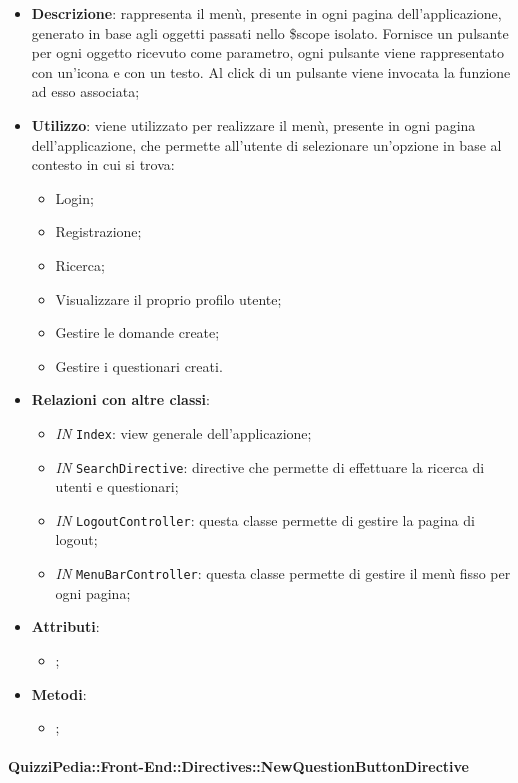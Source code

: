 \begin{itemize}
	\item \textbf{Descrizione}: rappresenta il menù, presente in ogni pagina dell'applicazione, generato in base agli oggetti passati nello \$scope isolato. Fornisce un pulsante per ogni oggetto ricevuto come parametro, ogni pulsante viene rappresentato con un’icona e con un testo. Al click di un pulsante viene invocata la funzione ad esso associata;
	\item \textbf{Utilizzo}: viene utilizzato per realizzare il menù, presente in ogni pagina dell'applicazione, che permette all'utente di selezionare un'opzione in base al contesto in cui si trova:
		\begin{itemize}
			\item Login;
			\item Registrazione;
			\item Ricerca;
			\item Visualizzare il proprio profilo utente;
			\item Gestire le domande create;
			\item Gestire i questionari creati.
		\end{itemize}
	\item \textbf{Relazioni con altre classi}: 
	\begin{itemize}
		\item \textit{IN} \texttt{Index}: view generale dell'applicazione;
		\item \textit{IN} \texttt{SearchDirective}: directive che permette di effettuare la ricerca di utenti e questionari;
		\item \textit{IN} \texttt{LogoutController}: questa classe permette di gestire la pagina di logout;
		\item \textit{IN} \texttt{MenuBarController}: questa classe permette di gestire il menù fisso per ogni pagina;
	\end{itemize}
	\item \textbf{Attributi}: 
	\begin{itemize}
		\item ;
	\end{itemize}
	\item \textbf{Metodi}: 
	\begin{itemize}
		\item ;
	\end{itemize}
\end{itemize}

\paragraph{QuizziPedia::Front-End::Directives::NewQuestionButtonDirective}

